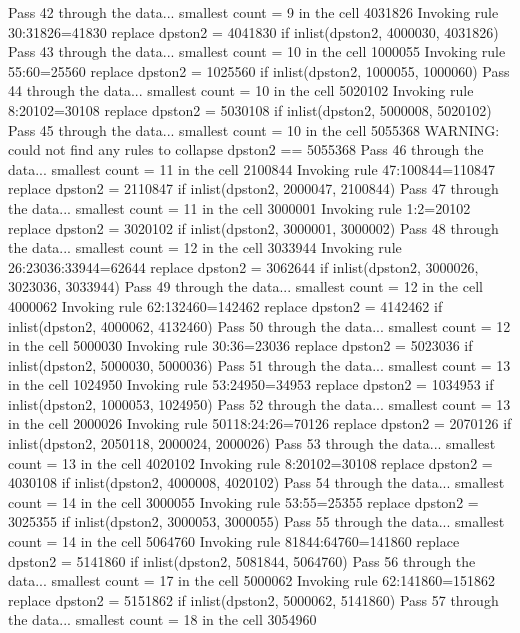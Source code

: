Pass 42 through the data...
  smallest count = 9 in the cell      4031826
  Invoking rule 30:31826=41830
  replace dpston2 = 4041830 if inlist(dpston2, 4000030, 4031826)
Pass 43 through the data...
  smallest count = 10 in the cell      1000055
  Invoking rule 55:60=25560
  replace dpston2 = 1025560 if inlist(dpston2, 1000055, 1000060)
Pass 44 through the data...
  smallest count = 10 in the cell      5020102
  Invoking rule 8:20102=30108
  replace dpston2 = 5030108 if inlist(dpston2, 5000008, 5020102)
Pass 45 through the data...
  smallest count = 10 in the cell      5055368
  WARNING: could not find any rules to collapse dpston2 == 5055368
Pass 46 through the data...
  smallest count = 11 in the cell      2100844
  Invoking rule 47:100844=110847
  replace dpston2 = 2110847 if inlist(dpston2, 2000047, 2100844)
Pass 47 through the data...
  smallest count = 11 in the cell      3000001
  Invoking rule 1:2=20102
  replace dpston2 = 3020102 if inlist(dpston2, 3000001, 3000002)
Pass 48 through the data...
  smallest count = 12 in the cell      3033944
  Invoking rule 26:23036:33944=62644
  replace dpston2 = 3062644 if inlist(dpston2, 3000026, 3023036, 3033944)
Pass 49 through the data...
  smallest count = 12 in the cell      4000062
  Invoking rule 62:132460=142462
  replace dpston2 = 4142462 if inlist(dpston2, 4000062, 4132460)
Pass 50 through the data...
  smallest count = 12 in the cell      5000030
  Invoking rule 30:36=23036
  replace dpston2 = 5023036 if inlist(dpston2, 5000030, 5000036)
Pass 51 through the data...
  smallest count = 13 in the cell      1024950
  Invoking rule 53:24950=34953
  replace dpston2 = 1034953 if inlist(dpston2, 1000053, 1024950)
Pass 52 through the data...
  smallest count = 13 in the cell      2000026
  Invoking rule 50118:24:26=70126
  replace dpston2 = 2070126 if inlist(dpston2, 2050118, 2000024, 2000026)
Pass 53 through the data...
  smallest count = 13 in the cell      4020102
  Invoking rule 8:20102=30108
  replace dpston2 = 4030108 if inlist(dpston2, 4000008, 4020102)
Pass 54 through the data...
  smallest count = 14 in the cell      3000055
  Invoking rule 53:55=25355
  replace dpston2 = 3025355 if inlist(dpston2, 3000053, 3000055)
Pass 55 through the data...
  smallest count = 14 in the cell      5064760
  Invoking rule 81844:64760=141860
  replace dpston2 = 5141860 if inlist(dpston2, 5081844, 5064760)
Pass 56 through the data...
  smallest count = 17 in the cell      5000062
  Invoking rule 62:141860=151862
  replace dpston2 = 5151862 if inlist(dpston2, 5000062, 5141860)
Pass 57 through the data...
  smallest count = 18 in the cell      3054960
